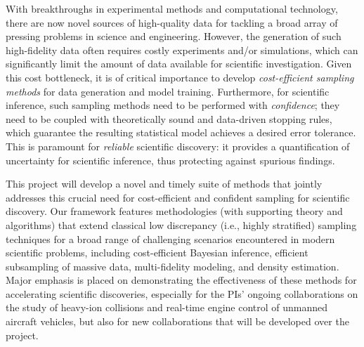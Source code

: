 \documentclass[11pt]{article}%
\begin{document}

\noindent With breakthroughs in experimental methods and computational technology, there are now novel sources of high-quality data for tackling a broad array of pressing problems in science and engineering. However, the generation of such high-fidelity data often requires costly experiments and/or simulations, which can significantly limit the amount of data available for scientific investigation. Given this cost bottleneck, it is of critical importance to develop \emph{cost-efficient sampling methods} for data generation and model training. Furthermore, for scientific inference, such sampling methods need to be performed with \emph{confidence}; they need to be coupled with theoretically sound and data-driven stopping rules, which guarantee the resulting statistical model achieves a desired error tolerance. This is paramount for \textit{reliable} scientific discovery: it provides a quantification of uncertainty for scientific inference, thus protecting against spurious findings.

This project will develop a novel and timely suite of methods that jointly addresses this crucial need for cost-efficient and confident sampling for scientific discovery. Our framework features methodologies (with supporting theory and algorithms) that extend classical low discrepancy (i.e., highly stratified) sampling techniques for a broad range of challenging scenarios encountered in modern scientific problems, including cost-efficient Bayesian inference, efficient subsampling of massive data, multi-fidelity modeling, and density estimation. Major emphasis is placed on demonstrating the effectiveness of these methods for accelerating scientific discoveries, especially for the PIs' ongoing collaborations on the study of heavy-ion collisions and real-time engine control of unmanned aircraft vehicles, but also for new collaborations that will be developed over the project.

\bigskip

\end{document}
